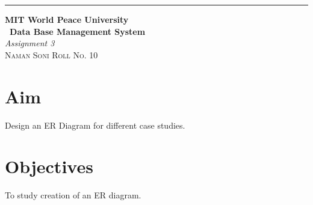 \documentclass{article}
\begin{document}
\begin{titlepage} %
		
		\raggedleft\rule{1pt}{\textheight} %
		\hspace{0.05\textwidth} %
		\parbox[b]{0.75\textwidth}
		{ %
			
			{\Huge\bfseries MIT World Peace University \\[0.5\baselineskip] \ Data Base Management System}\\[2\baselineskip] %
			{\large\textit{Assignment 3}}\\[4\baselineskip] %
			{\Large\textsc{Naman Soni Roll No. 10}} %
			
			\vspace{0.5\textheight} %
		}
		
\end{titlepage}
\tableofcontents
\pagebreak
\section{\textbf{Aim}}
Design an ER Diagram for different case studies.
\section{\textbf{Objectives}}
To study creation of an ER diagram.
\end{document}
